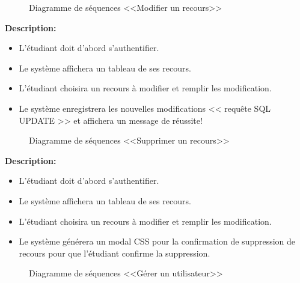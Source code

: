 \documentclass[12pt]{report}
\begin{document}
\newpage

\begin{figure}[h]
\centering
    \caption{Diagramme de séquences <<Modifier un recours>>}
\end{figure}

\vspace{0.2in}

\textbf{Description:}

\begin{itemize}
    \item L'étudiant doit d'abord s'authentifier.
    \item Le système affichera un tableau de ses recours.
    \item L'étudiant choisira un recours à modifier et remplir les modification.
    \item Le système enregistrera les nouvelles modifications << requête SQL UPDATE >> et affichera un message de réussite!
\end{itemize}

\newpage

\begin{figure}[h]
\centering
    \caption{Diagramme de séquences <<Supprimer un recours>>}
\end{figure}

\vspace{0.2in}

\textbf{Description:}

\begin{itemize}
    \item L'étudiant doit d'abord s'authentifier.
    \item Le système affichera un tableau de ses recours.
    \item L'étudiant choisira un recours à modifier et remplir les modification.
    \item Le système générera un modal CSS pour la confirmation de suppression de recours pour que l'étudiant confirme la suppression.
\end{itemize}

\newpage

\begin{figure}[h]
\centering
    \caption{Diagramme de séquences <<G\'erer un utilisateur>>}
\end{figure}
\end{document}
